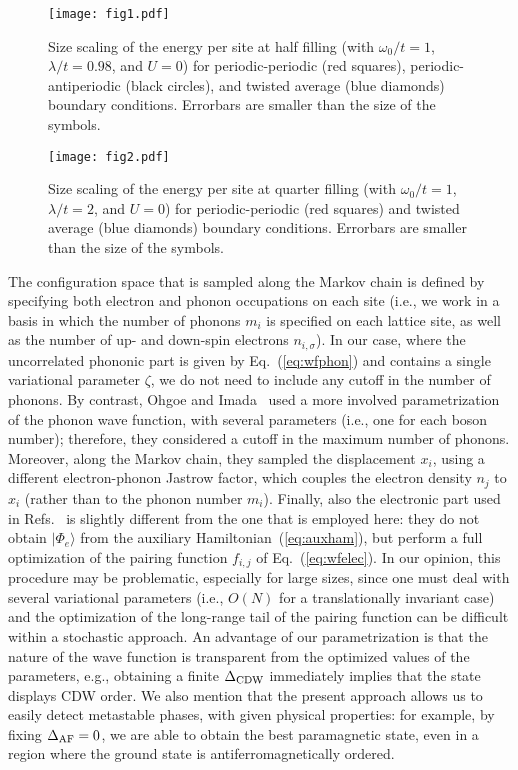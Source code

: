 \documentclass[aps,superscriptaddress,amsmath,amssymb,twocolumn,showpacs,floatfix,english]{revtex4}
\begin{document}
\begin{figure}
\texttt{[image: fig1.pdf]}
\caption{\label{fig:boundary1}
Size scaling of the energy per site at half filling (with $\omega_0/t=1$, $\lambda/t=0.98$, and $U=0$) for periodic-periodic (red squares), 
periodic-antiperiodic (black circles), and twisted average (blue diamonds) boundary conditions. Errorbars are smaller than the size of the 
symbols.}
\end{figure}

\begin{figure}
\texttt{[image: fig2.pdf]}
\caption{\label{fig:boundary2}
Size scaling of the energy per site at quarter filling (with $\omega_0/t=1$, $\lambda/t=2$, and $U=0$) for periodic-periodic (red squares) 
and twisted average (blue diamonds) boundary conditions. Errorbars are smaller than the size of the symbols.}
\end{figure}

The configuration space that is sampled along the Markov chain is defined by specifying both electron and phonon occupations on each
site (i.e., we work in a basis in which the number of phonons $m_{i}$ is specified on each lattice site, as well as the number of 
up- and down-spin electrons $n_{i,\sigma}$). In our case, where the uncorrelated phononic part is given by Eq.~(\ref{eq:wfphon}) and
contains a single variational parameter $\zeta$, we do not need to include any cutoff in the number of phonons. By contrast, Ohgoe and 
Imada~\cite{Ohgoe2017,Ohgoe2014} used a more involved parametrization of the phonon wave function, with several parameters (i.e., one
for each boson number); therefore, they considered a cutoff in the maximum number of phonons. Moreover, along the Markov chain, they 
sampled the displacement $x_i$, using a different electron-phonon Jastrow factor, which couples the electron density $n_{j}$ to $x_{i}$ 
(rather than to the phonon number $m_{i}$). Finally, also the electronic part used in Refs.~\cite{Ohgoe2017,Ohgoe2014} is slightly 
different from the one that is employed here: they do not obtain $|\Phi_{e}\rangle$ from the auxiliary Hamiltonian~(\ref{eq:auxham}), 
but perform a full optimization of the pairing function $f_{i,j}$ of Eq.~(\ref{eq:wfelec}). In our opinion, this procedure may be 
problematic, especially for large sizes, since one must deal with several variational parameters (i.e., $O(N)$ for a translationally 
invariant case) and the optimization of the long-range tail of the pairing function can be difficult within a stochastic approach. 
An advantage of our parametrization is that the nature of the wave function is transparent from the optimized values of the parameters, 
e.g., obtaining a finite $\Delta_{\rm CDW}$ immediately implies that the state displays CDW order. We also mention that the present 
approach allows us to easily detect metastable phases, with given physical properties: for example, by fixing $\Delta_{\rm AF}=0$, 
we are able to obtain the best paramagnetic state, even in a region where the ground state is antiferromagnetically ordered. 
\end{document}
